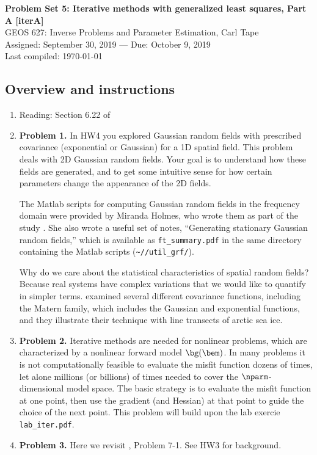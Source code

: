 \documentclass[11pt,titlepage,fleqn]{article}
\begin{document}
 

\begin{spacing}{1.2}
\centering
{\large \bf Problem Set 5: Iterative methods with generalized least squares, Part A [iterA]} \\
GEOS 627: Inverse Problems and Parameter Estimation, Carl Tape \\
Assigned: September 30, 2019 --- Due: October 9, 2019 \\
Last compiled: \today
\end{spacing}


\subsection*{Overview and instructions}

\begin{enumerate}
\item Reading: Section 6.22 of \citet{Tarantola2005}

\item {\bf Problem 1.} In HW4 you explored Gaussian random fields with prescribed covariance (exponential or Gaussian) for a 1D spatial field. This problem deals with 2D Gaussian random fields. Your goal is to understand how these fields are generated, and to get some intuitive sense for how certain parameters change the appearance of the 2D fields.

The Matlab scripts for computing Gaussian random fields in the frequency domain were provided by Miranda Holmes, who wrote them as part of the study \citet{BuhlerHolmes2009}. She also wrote a useful set of notes, ``Generating stationary Gaussian random fields,'' which is available as \verb+ft_summary.pdf+ in the same directory containing the Matlab scripts (\verb+~/+\repodir\verb+/util_grf/+).

Why do we care about the statistical characteristics of spatial random fields? Because real systems have complex variations that we would like to quantify in simpler terms. \citet{Gneiting2012} examined several different covariance functions, including the Matern family, which includes the Gaussian and exponential functions, and they illustrate their technique with line transects of arctic sea ice.

\item {\bf Problem 2.} Iterative methods are needed for nonlinear problems, which are characterized by a nonlinear forward model $\bg(\bem)$. In many problems it is not computationally feasible to evaluate the misfit function dozens of times, let alone millions (or billions) of times needed to cover the $\nparm$-dimensional model space. The basic strategy is to evaluate the misfit function at one point, then use the gradient (and Hessian) at that point to guide the choice of the next point. This problem will build upon the lab exercie \verb+lab_iter.pdf+.

\item {\bf Problem 3.} Here we revisit \citet{Tarantola2005}, Problem 7-1. See HW3 for background.

\end{enumerate}
\end{document}
